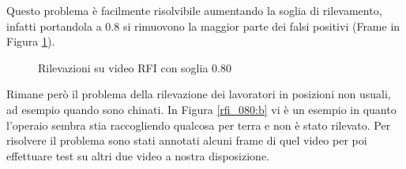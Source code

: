 Questo problema è facilmente risolvibile aumentando la soglia di rilevamento, infatti portandola a $0.8$ si rimuovono la maggior parte dei falsi positivi (Frame in Figura \ref{fig:rfi_080}). 

\begin{figure}[]
    \begin{minipage}{.5\linewidth}
        \centering
    \end{minipage}%
    \begin{minipage}{.5\linewidth}
        \centering
    \end{minipage}
    \centering
    \caption{Rilevazioni su video RFI con soglia 0.80}
    \label{fig:rfi_080}
\end{figure}

Rimane però il problema  della rilevazione dei lavoratori in posizioni non usuali, ad esempio quando sono chinati. In Figura \ref{rfi_080:b} vi è un esempio in quanto l'operaio sembra stia raccogliendo qualcosa per terra e non è stato rilevato. Per risolvere il problema sono stati annotati alcuni frame di quel video per poi effettuare test su altri due video a nostra disposizione. 
